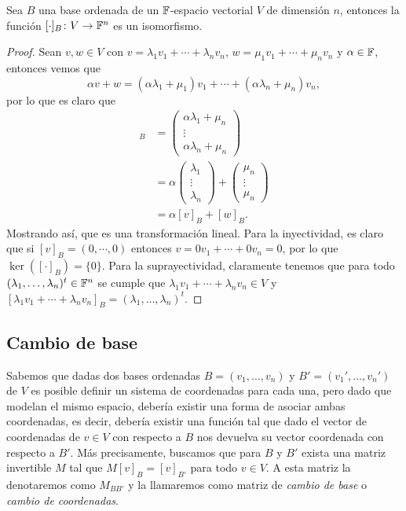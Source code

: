 \begin{prop}
  Sea $B$ una base ordenada de un $\mathbb{F}$-espacio vectorial $V$ de dimensión $n$, entonces la función $[\cdot]_B\colon V \to \mathbb{F}^n$ es un isomorfismo.
\end{prop}
\begin{proof}
  Sean $v,w \in V$ con $v = \lambda_1 v_1 + \cdots + \lambda_n v_n$, $w = \mu_1 v_1 + \cdots + \mu_n v_n$ y $\alpha \in \mathbb{F}$, entonces vemos que
  \[
  \alpha v+w =  (\alpha\lambda_1+\mu_1) v_1 + \cdots + (\alpha\lambda_n+\mu_n) v_n,
  \]
  por lo que es claro que
  \begin{align*}
    [\alpha v+w]_B 
      &= \begin{pmatrix} \alpha\lambda_1+\mu_n \\ \vdots \\ \alpha\lambda_n+\mu_n \end{pmatrix} \\
      &= \alpha\begin{pmatrix} \lambda_1 \\ \vdots \\ \lambda_n \end{pmatrix}
       + \begin{pmatrix} \mu_n \\ \vdots \\ \mu_n  \end{pmatrix} \\
      &= \alpha[v]_B + [w]_B.
  \end{align*}
  Mostrando así, que es una transformación lineal. Para la inyectividad, es claro que si $[v]_B = (0,\cdots,0)$ entonces $v = 0v_1 + \cdots + 0v_n = 0$, por lo que $\ker([\cdot]_B) = \{0\}$. Para la suprayectividad, claramente tenemos que para todo $(\lambda_1, \ldots, \lambda_n)^t \in \mathbb{F}^n$ se cumple que $\lambda_1 v_1 + \cdots + \lambda_n v_n \in V$ y  $[\lambda_1 v_1 + \cdots  + \lambda_n v_n]_B = (\lambda_1, \ldots, \lambda_n)^t$.
\end{proof}


\subsection{Cambio de base}

Sabemos que dadas dos bases ordenadas $B = (v_1,\ldots,v_n)$ y $B' = (v_1',\ldots,v_n')$ de $V$ es posible definir un sistema de coordenadas para cada una, pero dado que modelan el mismo espacio, debería existir una forma de asociar ambas coordenadas, es decir, debería existir una función tal que dado el vector de coordenadas de $v \in V$ con respecto a $B$ nos devuelva su vector coordenada con respecto a $B'$. Más precisamente, buscamos que para $B$ y $B'$ exista una matriz invertible $M$ tal que $M [v]_B = [v]_{B'}$ para todo $v \in V$. A esta matriz la denotaremos como $M_{BB'}$ y la llamaremos como matriz de \emph{cambio de base} o \emph{cambio de coordenadas}.

